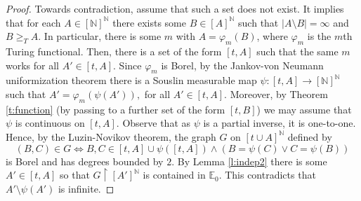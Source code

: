 \documentclass[10pt,a4paper]{article}
\newcommand{\N}{\mathbb{N}}
\renewcommand{\restriction}[2]{#1 \upharpoonright #2}
\theoremstyle{definition}
\numberwithin{equation}{section}
\begin{document}
	\begin{proof}
		Towards contradiction, assume that such a set does not exist. It implies that for each $A \in [\N]^\N$ there exists some $B \in [A]^\N$ such that $|A \setminus B|=\infty$ and $B \geq_T A$. In particular, there is some $m$ with $A=\varphi_m(B)$, where $\varphi_m$ is the $m$th Turing functional. Then, there is a set of the form $[t,A]$ such that the same $m$ works for all $A' \in [t,A]$. Since $\varphi_m$ is Borel, by the Jankov-von Neumann uniformization theorem there is a Souslin measurable map $\psi: [t,A] \to [\N]^\N$ such that $A'=\varphi_m(\psi(A')),$ for all $A' \in [t,A].$ Moreover, by Theorem \ref{t:function} (by passing to a further set of the form $[t,B]$) we may assume that $\psi$ is continuous on $[t,A]$. Observe that as $\psi$ is a partial inverse, it is one-to-one. Hence, by the Luzin-Novikov theorem, the graph $G$ on $[t\cup A]^\N$ defined by \[(B,C) \in G \iff B,C \in [t,A] \cup \psi([t,A]) \land (B=\psi(C) \lor C=\psi(B))\] is Borel and has degrees bounded by $2$. By Lemma \ref{l:indep2} there is some $A' \in [t,A]$ so that $\restriction{G}{[A']^\N}$ is contained in $\mathbb{E}_0$. This contradicts that $A' \setminus \psi(A')$ is infinite. 
	\end{proof}
\end{document}
